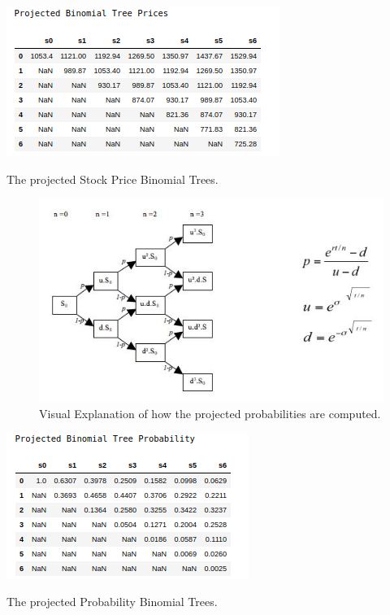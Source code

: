 \begin{table}[H]
\centering
  \includegraphics[scale = .90]{imgs/binomial_prices.png}
  \caption{The projected Stock Price Binomial Trees. }
  \label{tbl:binomial_prices}
\end{table}

\begin{figure}[H]
\centering
  \includegraphics[scale = .75]{imgs/binomial_example_prob.JPG}
  \caption{Visual Explanation of how the projected probabilities are computed.}
  \label{fig:binomial_ex2}
\end{figure}

\begin{table}[H]
\centering
  \includegraphics[scale = .90]{imgs/binomial_probs.png}
  \caption{The projected Probability Binomial Trees. }
  \label{tbl:binomial_probs}
\end{table}

